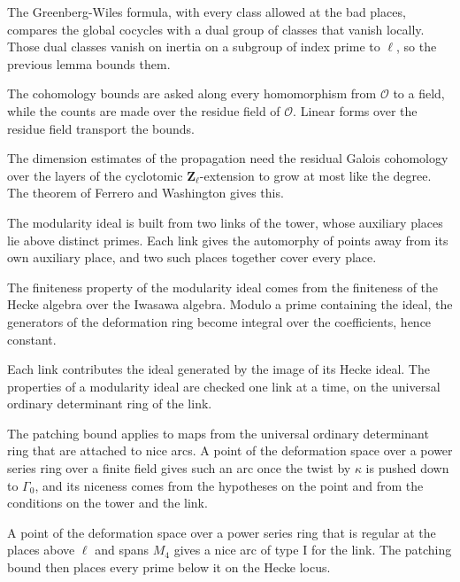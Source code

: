 The Greenberg-Wiles formula, with every class allowed at the bad places, compares the global cocycles with a dual group of classes that vanish locally. Those dual classes vanish on inertia on a subgroup of index prime to $\ell$, so the previous lemma bounds them.

The cohomology bounds are asked along every homomorphism from $\mathcal O$ to a field, while the counts are made over the residue field of $\mathcal O$. Linear forms over the residue field transport the bounds.

The dimension estimates of the propagation need the residual Galois cohomology over the layers of the cyclotomic $\mathbf Z_\ell$-extension to grow at most like the degree. The theorem of Ferrero and Washington gives this.

The modularity ideal is built from two links of the tower, whose auxiliary places lie above distinct primes. Each link gives the automorphy of points away from its own auxiliary place, and two such places together cover every place.

The finiteness property of the modularity ideal comes from the finiteness of the Hecke algebra over the Iwasawa algebra. Modulo a prime containing the ideal, the generators of the deformation ring become integral over the coefficients, hence constant.

Each link contributes the ideal generated by the image of its Hecke ideal. The properties of a modularity ideal are checked one link at a time, on the universal ordinary determinant ring of the link.

The patching bound applies to maps from the universal ordinary determinant ring that are attached to nice arcs. A point of the deformation space over a power series ring over a finite field gives such an arc once the twist by $\kappa$ is pushed down to $\Gamma_0$, and its niceness comes from the hypotheses on the point and from the conditions on the tower and the link.

A point of the deformation space over a power series ring that is regular at the places above $\ell$ and spans $M_4$ gives a nice arc of type I for the link. The patching bound then places every prime below it on the Hecke locus.

